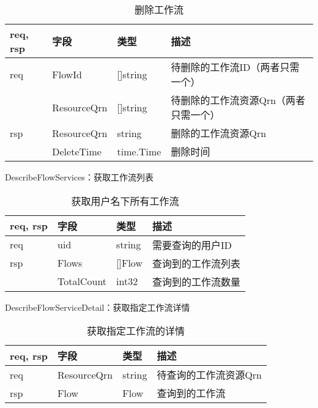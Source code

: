 \begin{table}[H]
    \centering
    \caption{删除工作流}
    \label{tab:design-interface-flow-delete}
    \begin{tabular}{llll}
        \toprule
        req, rsp   & 字段 & 类型 & 描述 \\
        \midrule
        req & FlowId & []string & 待删除的工作流ID（两者只需一个） \\
        & ResourceQrn & []string & 待删除的工作流资源Qrn（两者只需一个） \\ \hline
        rsp & ResourceQrn & string & 删除的工作流资源Qrn \\
        & DeleteTime & time.Time & 删除时间 \\
        \bottomrule
    \end{tabular}
\end{table}

DescribeFlowServices：获取工作流列表

\begin{table}[H]
    \centering
    \caption{获取用户名下所有工作流}
    \label{tab:design-interface-flow-services}
    \begin{tabular}{llll}
        \toprule
        req, rsp   & 字段 & 类型 & 描述 \\
        \midrule
        req & uid & string & 需要查询的用户ID \\ \hline
        rsp & Flows & []Flow & 查询到的工作流列表 \\
        & TotalCount & int32 & 查询到的工作流数量 \\
        \bottomrule
    \end{tabular}
\end{table}

DescribeFlowServiceDetail：获取指定工作流详情

\begin{table}[H]
    \centering
    \caption{获取指定工作流的详情}
    \label{tab:design-interface-flow-detail}
    \begin{tabular}{llll}
        \toprule
        req, rsp   & 字段 & 类型 & 描述 \\
        \midrule
        req & ResourceQrn & string & 待查询的工作流资源Qrn \\ \hline
        rsp & Flow & Flow & 查询到的工作流 \\
        \bottomrule
    \end{tabular}
\end{table}


